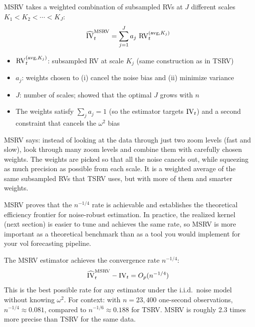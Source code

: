 \begin{definition}
MSRV takes a weighted combination of subsampled RVs at $J$ different scales $K_1 < K_2 < \cdots < K_J$:
\begin{equation}
  \widehat{\operatorname{IV}}_t^{\text{MSRV}} = \sum_{j=1}^{J} a_j \, \operatorname{RV}^{(\text{avg}, K_j)}_t
  \label{eq:msrv}
\end{equation}
\begin{itemize}[nosep]
  \item $\operatorname{RV}^{(\text{avg}, K_j)}_t$: subsampled RV at scale $K_j$ (same construction as in TSRV)
  \item $a_j$: weights chosen to (i) cancel the noise bias and (ii) minimize variance
  \item $J$: number of scales; \citet{Zhang2006} showed that the optimal $J$ grows with $n$
  \item The weights satisfy $\sum_j a_j = 1$ (so the estimator targets $\operatorname{IV}_t$) and a second constraint that cancels the $\omega^2$ bias
\end{itemize}
\end{definition}

\begin{intuition}
MSRV says: instead of looking at the data through just two zoom levels (fast and slow), look through many zoom levels and combine them with carefully chosen weights.
The weights are picked so that all the noise cancels out, while squeezing as much precision as possible from each scale.
It is a weighted average of the same subsampled RVs that TSRV uses, but with more of them and smarter weights.
\end{intuition}

\begin{projectconnection}
MSRV proves that the $n^{-1/4}$ rate is achievable and establishes the theoretical efficiency frontier for noise-robust estimation.
In practice, the realized kernel (next section) is easier to tune and achieves the same rate, so MSRV is more important as a theoretical benchmark than as a tool you would implement for your vol forecasting pipeline.
\end{projectconnection}

\begin{keyresult}
The MSRV estimator achieves the convergence rate $n^{-1/4}$:
\[
  \widehat{\operatorname{IV}}_t^{\text{MSRV}} - \operatorname{IV}_t = O_p(n^{-1/4})
\]
This is the best possible rate for any estimator under the i.i.d.\ noise model without knowing $\omega^2$.
For context: with $n = 23{,}400$ one-second observations, $n^{-1/4} \approx 0.081$, compared to $n^{-1/6} \approx 0.188$ for TSRV.
MSRV is roughly 2.3 times more precise than TSRV for the same data.
\end{keyresult}


